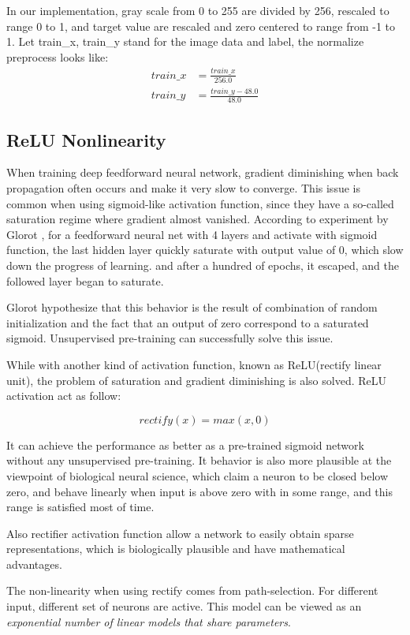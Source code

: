 \documentclass[10pt,twocolumn,letterpaper]{article}
\begin{document}
In our implementation, gray scale from 0 to 255 are divided by 256, rescaled to range 0 to 1,
and target value are rescaled and zero centered to range from -1 to 1. Let train\_x, train\_y
stand for the image data and label, the normalize preprocess looks like:
$$
	\begin{aligned}
		train\_x &= \frac{train\_x}{256.0} \\
		train\_y &= \frac{train\_y - 48.0}{48.0}
	\end{aligned}
$$

\subsection{ReLU Nonlinearity}
When training deep feedforward neural network, gradient diminishing when back propagation
often occurs and make it very slow to converge. This issue is common when using sigmoid-like
activation function, since they have a so-called saturation regime where gradient almost vanished.
According to experiment by Glorot \cite{glorot2010understanding}, for a feedforward neural net
with 4 layers and activate with sigmoid function, the last hidden layer quickly saturate with
output value of 0, which slow down the progress of learning. and after a hundred of epochs,
it escaped, and the followed layer began to saturate.

Glorot hypothesize that this behavior is the result of combination of random initialization
and the fact that an output of zero correspond to a saturated sigmoid. Unsupervised pre-training
can successfully solve this issue.

While with another kind of activation function, known as ReLU(rectify linear unit), the problem
of saturation and gradient diminishing is also solved. ReLU activation act as follow:

$$
rectify(x) = max(x, 0)
$$

It can achieve the performance as better
as a pre-trained sigmoid network\cite{glorot2011deep} without any unsupervised pre-training.
It behavior is also more plausible at the viewpoint of biological neural science, which claim
a neuron to be closed below zero, and behave linearly when input is above zero with in some range,
and this range is satisfied most of time.

Also rectifier activation function allow a network to easily obtain sparse representations, which
is biologically plausible and have mathematical advantages.

The non-linearity when using rectify comes from path-selection. For different input, different
set of neurons are active. This model can be viewed as an \emph{exponential
number of linear models that share parameters}\cite{nair2010rectified}.
\end{document}
